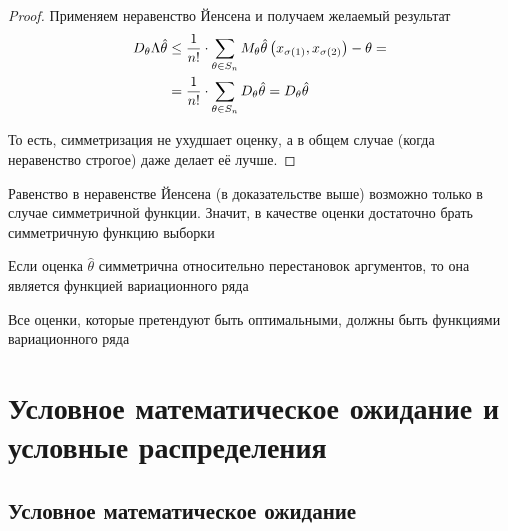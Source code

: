 \begin{proof}
    Применяем неравенство Йенсена и получаем желаемый результат
    \begin{align*}
        D_{\theta} \Lambda\hat{\theta}
            &\le\frac{1}{n!}\cdot\sum_{\theta\in S_n}M_{\theta} 
                \hat{\theta}\left(x_{\sigma\left(1\right)},
                    x_{\sigma\left(2\right)}\right)
                    -\theta=\\
            &=\frac{1}{n!}\cdot\sum_{\theta\in S_n}
                D_{\theta} \hat{\theta}
            =D_{\theta} \hat{\theta}
    \end{align*}

    То есть, симметризация не ухудшает оценку,
    а в общем случае (когда неравенство строгое) даже делает её лучше.
\end{proof}

\begin{remark}
    Равенство в неравенстве Йенсена (в доказательстве выше)
    возможно только в случае симметричной функции.
    Значит, в качестве оценки достаточно брать симметричную функцию выборки
\end{remark}
\begin{remark}
    Если оценка $\hat{\theta}$ симметрична относительно перестановок аргументов,
    то она является функцией вариационного ряда
\end{remark}
\begin{remark}
    Все оценки, которые претендуют быть оптимальными,
    должны быть функциями вариационного ряда
\end{remark}
\section{Условное математическое ожидание и условные распределения}
\subsection{Условное математическое ожидание}
